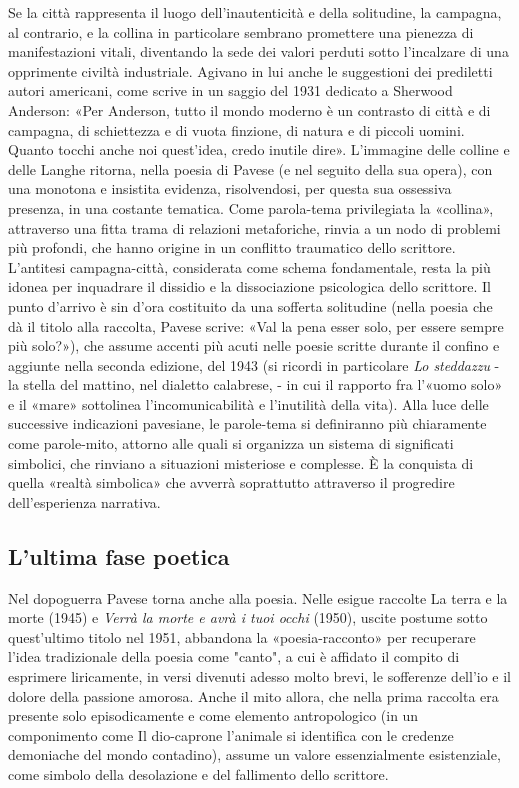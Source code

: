 \documentclass[a4paper, twoside, titlepage]{book}
\newcounter{mar}
\begin{document}
Se la città rappresenta il luogo dell'inautenticità e della solitudine, la campagna, al contrario, e la collina in particolare sembrano promettere una pienezza di manifestazioni vitali, diventando la sede dei valori perduti sotto l'incalzare di una opprimente civiltà industriale. Agivano in lui anche le suggestioni dei prediletti autori americani, come scrive in un saggio del 1931 dedicato a Sherwood Anderson: «Per Anderson, tutto il mondo moderno è un contrasto di città e di campagna, di schiettezza e di vuota finzione, di natura e di piccoli uomini. Quanto tocchi anche noi quest'idea, credo inutile dire». L'immagine delle colline e delle Langhe ritorna, nella poesia di Pavese (e nel seguito della sua opera), con una monotona e insistita evidenza, risolvendosi, per questa sua ossessiva presenza, in una costante tematica. Come parola-tema privilegiata la «collina», attraverso una fitta trama di relazioni metaforiche, rinvia a un nodo di problemi più profondi, che hanno origine in un conflitto traumatico dello scrittore. L'antitesi campagna-città, considerata come schema fondamentale, resta la più idonea per inquadrare il dissidio e la dissociazione psicologica dello scrittore. Il punto d'arrivo è sin d'ora costituito da una sofferta solitudine (nella poesia che dà il titolo alla raccolta, Pavese scrive: «Val la pena esser solo, per essere sempre più solo?»), che assume accenti più acuti nelle poesie scritte durante il confino e aggiunte nella seconda edizione, del 1943 (si ricordi in particolare \textit{Lo steddazzu} - la stella del mattino, nel dialetto calabrese, - in cui il rapporto fra l'«uomo solo» e il «mare» sottolinea l'incomunicabilità e l'inutilità della vita). Alla luce delle successive indicazioni pavesiane, le parole-tema si definiranno più chiaramente come parole-mito, attorno alle quali si organizza un sistema di significati simbolici, che rinviano a situazioni misteriose e complesse. È la conquista di quella «realtà simbolica» che avverrà soprattutto attraverso il progredire dell'esperienza narrativa.

\subsection{L'ultima fase poetica}

Nel dopoguerra Pavese torna anche alla poesia. Nelle esigue raccolte La terra e la morte (1945) e \textit{Verrà la morte e avrà i tuoi occhi} (1950), uscite postume sotto quest'ultimo titolo nel 1951, abbandona la «poesia-racconto» per recuperare l'idea tradizionale della poesia come "canto", a cui è affidato il compito di esprimere liricamente, in versi divenuti adesso molto brevi, le sofferenze dell'io e il dolore della passione amorosa. Anche il mito allora, che nella prima raccolta era presente solo episodicamente e come elemento antropologico (in un componimento come Il dio-caprone l'animale si identifica con le credenze demoniache del mondo contadino), assume un valore essenzialmente esistenziale, come simbolo della desolazione e del fallimento dello scrittore.
\end{document}
